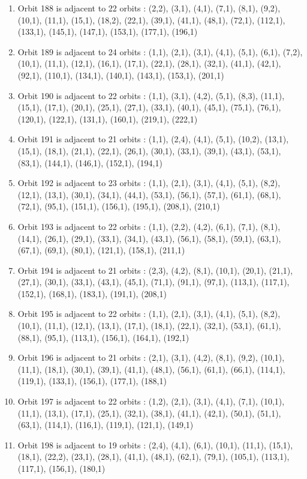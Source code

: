 \documentclass[12pt]{article}
\begin{document}
\begin{enumerate}
\item Orbit 188 is adjacent to 22 orbits : (2,2), (3,1), (4,1), (7,1), (8,1), (9,2), (10,1), (11,1), (15,1), (18,2), (22,1), (39,1), (41,1), (48,1), (72,1), (112,1), (133,1), (145,1), (147,1), (153,1), (177,1), (196,1)
\item Orbit 189 is adjacent to 24 orbits : (1,1), (2,1), (3,1), (4,1), (5,1), (6,1), (7,2), (10,1), (11,1), (12,1), (16,1), (17,1), (22,1), (28,1), (32,1), (41,1), (42,1), (92,1), (110,1), (134,1), (140,1), (143,1), (153,1), (201,1)
\item Orbit 190 is adjacent to 22 orbits : (1,1), (3,1), (4,2), (5,1), (8,3), (11,1), (15,1), (17,1), (20,1), (25,1), (27,1), (33,1), (40,1), (45,1), (75,1), (76,1), (120,1), (122,1), (131,1), (160,1), (219,1), (222,1)
\item Orbit 191 is adjacent to 21 orbits : (1,1), (2,4), (4,1), (5,1), (10,2), (13,1), (15,1), (18,1), (21,1), (22,1), (26,1), (30,1), (33,1), (39,1), (43,1), (53,1), (83,1), (144,1), (146,1), (152,1), (194,1)
\item Orbit 192 is adjacent to 23 orbits : (1,1), (2,1), (3,1), (4,1), (5,1), (8,2), (12,1), (13,1), (30,1), (34,1), (44,1), (53,1), (56,1), (57,1), (61,1), (68,1), (72,1), (95,1), (151,1), (156,1), (195,1), (208,1), (210,1)
\item Orbit 193 is adjacent to 22 orbits : (1,1), (2,2), (4,2), (6,1), (7,1), (8,1), (14,1), (26,1), (29,1), (33,1), (34,1), (43,1), (56,1), (58,1), (59,1), (63,1), (67,1), (69,1), (80,1), (121,1), (158,1), (211,1)
\item Orbit 194 is adjacent to 21 orbits : (2,3), (4,2), (8,1), (10,1), (20,1), (21,1), (27,1), (30,1), (33,1), (43,1), (45,1), (71,1), (91,1), (97,1), (113,1), (117,1), (152,1), (168,1), (183,1), (191,1), (208,1)
\item Orbit 195 is adjacent to 22 orbits : (1,1), (2,1), (3,1), (4,1), (5,1), (8,2), (10,1), (11,1), (12,1), (13,1), (17,1), (18,1), (22,1), (32,1), (53,1), (61,1), (88,1), (95,1), (113,1), (156,1), (164,1), (192,1)
\item Orbit 196 is adjacent to 21 orbits : (2,1), (3,1), (4,2), (8,1), (9,2), (10,1), (11,1), (18,1), (30,1), (39,1), (41,1), (48,1), (56,1), (61,1), (66,1), (114,1), (119,1), (133,1), (156,1), (177,1), (188,1)
\item Orbit 197 is adjacent to 22 orbits : (1,2), (2,1), (3,1), (4,1), (7,1), (10,1), (11,1), (13,1), (17,1), (25,1), (32,1), (38,1), (41,1), (42,1), (50,1), (51,1), (63,1), (114,1), (116,1), (119,1), (121,1), (149,1)
\item Orbit 198 is adjacent to 19 orbits : (2,4), (4,1), (6,1), (10,1), (11,1), (15,1), (18,1), (22,2), (23,1), (28,1), (41,1), (48,1), (62,1), (79,1), (105,1), (113,1), (117,1), (156,1), (180,1)

\end{enumerate}
\end{document}
